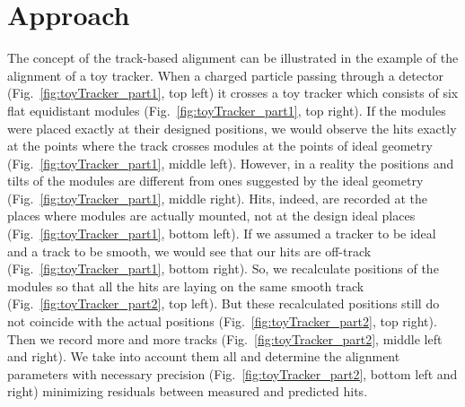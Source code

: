 \section{Approach}
\label{sec:alignmentAlg}




The concept of the track-based alignment can be illustrated in the example of the alignment of a toy tracker. When a charged particle passing through a detector (Fig.~\ref{fig:toyTracker_part1}, top left) it crosses a toy tracker which consists of six flat equidistant modules (Fig.~\ref{fig:toyTracker_part1}, top right). If the modules were placed exactly at their designed positions, we would observe the hits exactly at the points where the track crosses modules at the points of ideal geometry (Fig.~\ref{fig:toyTracker_part1}, middle left). However, in a reality the positions and tilts of the modules are different from ones suggested by the ideal geometry (Fig.~\ref{fig:toyTracker_part1}, middle right). Hits, indeed, are recorded at the places where modules are actually mounted, not at the design ideal places (Fig.~\ref{fig:toyTracker_part1}, bottom left). If we assumed a tracker to be ideal and a track to be smooth, we would see that our hits are off-track (Fig.~\ref{fig:toyTracker_part1}, bottom right). So, we recalculate positions of the modules so that all the hits are laying on the same smooth track (Fig.~\ref{fig:toyTracker_part2}, top left). But these recalculated positions still do not coincide with the actual positions (Fig.~\ref{fig:toyTracker_part2}, top right). Then we record more and more tracks (Fig.~\ref{fig:toyTracker_part2}, middle left and right). We take into account them all and determine the alignment parameters with necessary precision (Fig.~\ref{fig:toyTracker_part2}, bottom left and right) minimizing residuals between measured and predicted hits.


